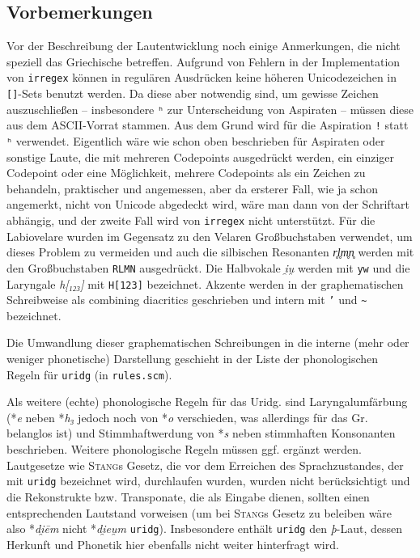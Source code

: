 \documentclass[12pt,a4paper,normalheadings]{scrartcl}
\def\rek#1{*\textit{#1}}
\def\bel#1{\textit{#1}}
\def\tt#1{\texttt{#1}}
\begin{document}
\subsection{Vorbemerkungen}
Vor der Beschreibung der Lautentwicklung noch einige Anmerkungen,
die nicht speziell das Griechische betreffen.
Aufgrund von Fehlern in der Implementation von \tt{irregex}
können in regulären Ausdrücken keine höheren Unicodezeichen
in \tt{[]}-Sets benutzt werden.
Da diese aber notwendig sind, um gewisse Zeichen auszuschließen
-- insbesondere \tt{ʰ} zur Unterscheidung von Aspiraten --
müssen diese aus dem ASCII-Vorrat stammen.
Aus dem Grund wird für die Aspiration \tt{!} statt \tt{ʰ} verwendet.
Eigentlich wäre wie schon oben beschrieben für Aspiraten oder sonstige Laute,
die mit mehreren Codepoints ausgedrückt werden,
ein einziger Codepoint
oder eine Möglichkeit, mehrere Codepoints als ein Zeichen zu behandeln,
praktischer und angemessen,
aber da ersterer Fall, wie ja schon angemerkt, nicht von Unicode
abgedeckt wird, wäre man dann von der Schriftart abhängig,
und der zweite Fall wird von \tt{irregex} nicht unterstützt.
Für die Labiovelare wurden im Gegensatz zu den Velaren Großbuchstaben verwendet,
um dieses Problem zu vermeiden und auch
die silbischen Resonanten \bel{r̥l̥m̥n̥} werden mit den Großbuchstaben \tt{RLMN} ausgedrückt.
Die Halbvokale \bel{i̯u̯} werden mit \tt{yw} und
die Laryngale \bel{h[₁₂₃]} mit \tt{H[123]} bezeichnet.
Akzente werden in der graphematischen Schreibweise
als combining diacritics geschrieben und intern mit \tt{'} und \tt{\textasciitilde}
bezeichnet.

Die Umwandlung dieser graphematischen Schreibungen in die interne
(mehr oder weniger phonetische) Darstellung geschieht in der Liste der
phonologischen Regeln für \tt{uridg} (in \tt{rules.scm}).

Als weitere (echte) phonologische Regeln für das Uridg.
sind Laryngalumfärbung (\rek{e} neben \rek{h₃} jedoch noch von \rek{o}
verschieden, was allerdings für das Gr. belanglos ist)
und Stimmhaftwerdung von \rek{s} neben stimmhaften Konsonanten beschrieben.
Weitere phonologische Regeln müssen ggf. ergänzt werden.
Lautgesetze wie \textsc{Stang}s Gesetz,
die vor dem Erreichen des Sprachzustandes, der mit \tt{uridg} bezeichnet wird,
durchlaufen wurden,
wurden nicht berücksichtigt und die Rekonstrukte bzw. Transponate,
die als Eingabe dienen, sollten einen entsprechenden Lautstand vorweisen
(um bei \textsc{Stang}s Gesetz zu beleiben wäre also \rek{di̯ēm} nicht \rek{di̯eu̯m} \tt{uridg}).
Insbesondere enthält \tt{uridg} den \textit{þ}-Laut,
dessen Herkunft und Phonetik hier ebenfalls nicht weiter hinterfragt wird.
\end{document}
